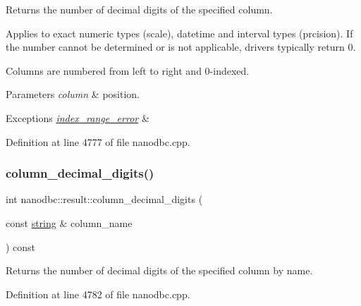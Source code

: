 Returns the number of decimal digits of the specified column. 

Applies to exact numeric types (scale), datetime and interval types (prcision). If the number cannot be determined or is not applicable, drivers typically return 0.

Columns are numbered from left to right and 0-\/indexed. 
\begin{DoxyParams}{Parameters}
{\em column} & position. \\
\hline
\end{DoxyParams}

\begin{DoxyExceptions}{Exceptions}
{\em \mbox{\hyperlink{classnanodbc_1_1index__range__error}{index\+\_\+range\+\_\+error}}} & \\
\hline
\end{DoxyExceptions}


Definition at line 4777 of file nanodbc.\+cpp.

\mbox{\label{classnanodbc_1_1result_aabbb9fb0a14a5b0fbb33fda4a1143b78}} 
\subsubsection{\texorpdfstring{column\_decimal\_digits()}{column\_decimal\_digits()}\hspace{0.1cm}{\footnotesize\ttfamily [2/2]}}
{\footnotesize\ttfamily int nanodbc\+::result\+::column\+\_\+decimal\+\_\+digits (\begin{DoxyParamCaption}\item[{const \mbox{\hyperlink{namespacenanodbc_abfc0ece56278e590911ec8352774c212}{string}} \&}]{column\+\_\+name }\end{DoxyParamCaption}) const}



Returns the number of decimal digits of the specified column by name. 



Definition at line 4782 of file nanodbc.\+cpp.

\mbox{\label{classnanodbc_1_1result_a2bd3fc4e416108960c4191b2cbba256b}} 
